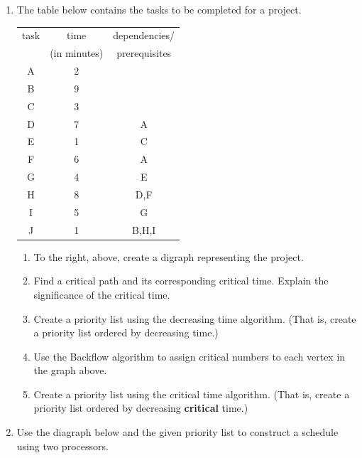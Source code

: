 \documentclass[12pt]{article}
\begin{document}
\begin{enumerate}
\newpage
\begin{center} {\Large{Scheduling}} \end{center}
\item The table below contains the tasks to be completed for a project.\\
\begin{tabular}{| c|c|c|}
\hline
task& time& dependencies/\\
&(in minutes)&prerequisites\\
\hline
A&2&\\ \hline
B&9&\\ \hline
C&3&\\ \hline
D&7&A\\ \hline
E&1&C\\ \hline
F&6&A\\ \hline
G&4&E\\ \hline
H&8&D,F\\ \hline
I&5&G\\ \hline
J&1&B,H,I\\ \hline
\end{tabular}
	\begin{enumerate}
	\item To the right, above, create a digraph representing the project.
	\item Find a critical path and its corresponding critical time. Explain the significance of the critical time.
	\vfill
	\item Create a priority list using the decreasing time algorithm. (That is, create a priority list ordered by decreasing time.)
	\vfill
	\item Use the Backflow algorithm to assign critical numbers to each vertex in the graph above.
	\item Create a priority list using the critical time algorithm. (That is, create a priority list ordered by decreasing \textbf{critical} time.)
	\vfill
	\end{enumerate} 
\newpage
\item Use the diagraph below and the given priority list to construct a schedule using two processors.

\def\r{2}
\def\s{.6}

\end{enumerate}
\end{document}
